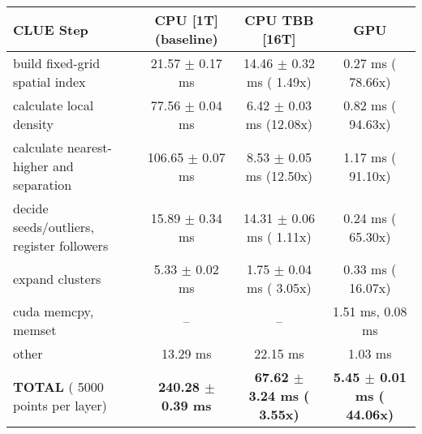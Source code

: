     \begin{tabular}{l|c|c|c}
    \hline
    CLUE Step                                 & CPU [1T] (baseline)         & CPU TBB [16T]                         & GPU                       \\ \hline
    build fixed-grid spatial index            &  21.57 $\pm$  0.17 ms       &  14.46 $\pm$  0.32 ms ( 1.49x)        &   0.27 ms ( 78.66x)       \\
    calculate local density                   &  77.56 $\pm$  0.04 ms       &   6.42 $\pm$  0.03 ms (12.08x)        &   0.82 ms ( 94.63x)       \\
    calculate nearest-higher and separation   & 106.65 $\pm$  0.07 ms       &   8.53 $\pm$  0.05 ms (12.50x)        &   1.17 ms ( 91.10x)       \\
    decide seeds/outliers, register followers &  15.89 $\pm$  0.34 ms       &  14.31 $\pm$  0.06 ms ( 1.11x)        &   0.24 ms ( 65.30x)       \\
    expand clusters                           &   5.33 $\pm$  0.02 ms       &   1.75 $\pm$  0.04 ms ( 3.05x)        &   0.33 ms ( 16.07x)       \\ \hline
    cuda memcpy, memset                       & --                          & --                                    &   1.51 ms,   0.08 ms      \\ 
    other                                     &  13.29 ms                   &  22.15 ms                             &   1.03 ms                 \\ \hline
    \textbf{TOTAL} ( 5000 points per layer)   & \textbf{240.28 $\pm$  0.39 ms} & \textbf{ 67.62 $\pm$  3.24 ms ( 3.55x)} & \textbf{  5.45 $\pm$  0.01 ms ( 44.06x)}  \\
    \hline 
    \end{tabular}
    \linebreak


